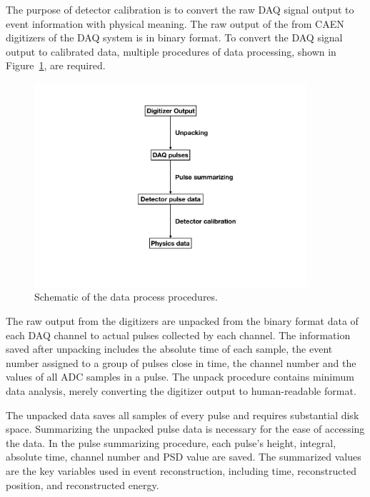 \label{Ch7}

The purpose of detector calibration is to convert the raw DAQ signal output to event information with physical meaning.
The raw output of the from CAEN digitizers of the DAQ system is in binary format.
To convert the DAQ signal output to calibrated data, multiple procedures of data processing, shown in Figure~\ref{fig:Unpacking}, are required.
\begin{figure}[ht]
\centering
\includegraphics[width=0.9\textwidth]{Figures/DataUnpacking.pdf}
\caption[Data process procedures]{
Schematic of the data process procedures. 
}
\label{fig:Unpacking}
\end{figure}


The raw output from the digitizers are unpacked from the binary format data of each DAQ channel to actual pulses collected by each channel.
The information saved after unpacking includes the absolute time of each sample, the event number assigned to a group of pulses close in time, the channel number and the values of all ADC samples in a pulse.
The unpack procedure contains minimum data analysis, merely converting the digitizer output to human-readable format.

The unpacked data saves all samples of every pulse and requires substantial disk space.
Summarizing the unpacked pulse data is necessary for the ease of accessing the data.
In the pulse summarizing procedure, each pulse's height, integral, absolute time, channel number and PSD value are saved.
The summarized values are the key variables used in event reconstruction, including time, reconstructed position, and reconstructed energy.

